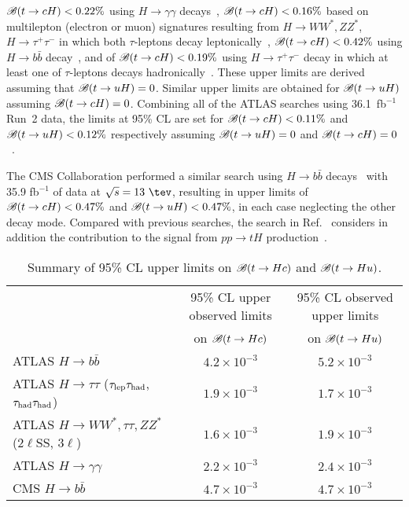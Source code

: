 $\mathscr{B}(t\to cH)<0.22\%$ using $H\to \gamma\gamma$ decays~\cite{Aaboud:2017mfd}, $\mathscr{B}(t\to cH)<0.16\%$ based on
multilepton (electron or muon) signatures resulting from 
$H \to  WW^*, ZZ^*$, $H\to \tau^+\tau^-$ in which both $\tau$-leptons decay leptonically~\cite{Aaboud:2018pob},
$\mathscr{B}(t\to cH)<0.42\%$ using $H\to b\bar{b}$ decay~\cite{fcnc36}, and of $\mathscr{B}(t\to cH)<0.19\%$ using $H\to \tau^+\tau^-$ decay in which at least
one of $\tau$-leptons decays hadronically~\cite{fcnc36}.  
These upper limits are derived assuming that $\mathscr{B}(t\to uH)=0$. Similar upper limits are obtained for $\mathscr{B}(t\to uH)$ assuming $\mathscr{B}(t\to cH)=0$.
Combining all of the ATLAS searches using 36.1~fb$^{-1}$ Run~2 data, the limits at 95\% CL are set for  $\mathscr{B}(t\to cH)<0.11\%$ and $\mathscr{B}(t\to uH)<0.12\%$ respectively assuming $\mathscr{B}(t\to uH)=0$ and $\mathscr{B}(t\to cH)=0$~\cite{fcnc36}.

The CMS Collaboration performed a similar search using  
$H\to b\bar{b}$ decays~\cite{Sirunyan:2017uae} with 35.9 fb$^{-1}$ of data at $\sqrt{s}=13~\tev$, resulting 
in upper limits of $\mathscr{B}(t\to cH)<0.47\%$ and $\mathscr{B}(t\to uH)<0.47\%$, in each case neglecting the other decay mode.
Compared with previous searches, the search in Ref.~\cite{Sirunyan:2017uae} considers in addition the contribution to the signal from 
$pp \to tH$ production~\cite{Greljo:2014dka}.


\begin{table}[t!]
\caption{\small{Summary of 95\% CL upper limits on $\mathscr{B}(t \to Hc)$ and $\mathscr{B}(t \to Hu)$.}}
\begin{center}
\begin{tabular}{lcc}
\toprule\toprule
 & \multicolumn{1}{c}{95\% CL upper observed limits} & \multicolumn{1}{c}{95\% CL observed upper limits}  \\
 & \multicolumn{1}{c}{on $\mathscr{B}(t \to Hc)$} & \multicolumn{1}{c}{on $\mathscr{B}(t \to Hu)$} \\
\midrule\midrule
ATLAS $H \to b\bar{b}$~\cite{fcnc36} & $4.2 \times 10^{-3}$ & $5.2 \times 10^{-3}$ \\
ATLAS $H \to \tau\tau$ ($\tau_{\mathrm{lep}} \tau_{\mathrm{had}}$, $\tau_{\mathrm{had}} \tau_{\mathrm{had}}$)~\cite{fcnc36} & $1.9 \times 10^{-3}$  & $1.7 \times 10^{-3}$  \\ 
ATLAS $H \to WW^*, \tau\tau, ZZ^*$ ($2\ell$SS, $3\ell$)~\cite{Aaboud:2018pob}  & $1.6 \times 10^{-3}$  & $1.9 \times 10^{-3}$  \\ 
ATLAS $H \to \gamma\gamma$~\cite{Aaboud:2017mfd} & $2.2 \times 10^{-3}$  & $2.4 \times 10^{-3}$  \\
CMS   $H\to b\bar{b}$~\cite{Sirunyan:2017uae} & $4.7 \times 10^{-3}$  & $4.7 \times 10^{-3}$  \\
\midrule
\bottomrule\bottomrule
\end{tabular}
\label{tab:limits_summary}
\end{center}
\end{table}



